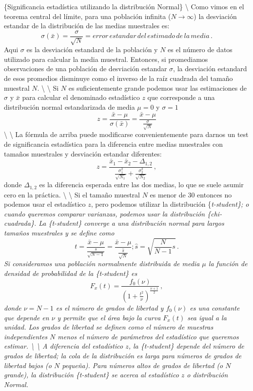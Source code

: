 \documentclass[
]{agujournal2019}
\begin{document}
\{\noindent  Significancia estadística utilizando la distribución
Normal\} \textbackslash{} Como vimos en el teorema central del límite,
para una población infinita (\(N\rightarrow\infty\)) la desviación
estandar de la distribución de las medias muestrales es:
\[\sigma(\bar{x})=\frac{\sigma}{\sqrt{N}}=error\,estandar\,del\,estimado\,de\,la\,media\,.\]
Aqui \(\sigma\) es la desviación estandard de la población y \(N\) es el
número de datos utilizado para calcular la media muestral. Entonces, si
promediamos observaciones de una población de desviación estandar
\(\sigma\), la desviación estandard de esos promedios disminuye como el
inverso de la raíz cuadrada del tamaño muestral \(N\). \textbackslash{}
\textbackslash{} Si \(N\) es suficientemente grande podemos usar las
estimaciones de \(\sigma\) y \(\bar{x}\) para calcular el denominado
estadístico \(z\) que corresponde a una distribución normal
estandarizada de media \(\mu=0\) y \(\sigma=1\)
\[z=\frac{\bar{x}-\mu}{\sigma(\bar{x})}=\frac{\bar{x}-\mu}{\frac{\sigma}{\sqrt{N}}}\]
\textbackslash{} \textbackslash{} La fórmula de arriba puede modificarse
convenientemente para darnos un test de significancia estadística para
la diferencia entre medias muestrales con tamaños muestrales y
desviación estandar diferentes:
\[z=\frac{\bar{x}_1-\bar{x}_2-\Delta_{1,2}}
  {\frac{\sigma_1^2}{\sqrt{N_1}} + \frac{\sigma_2^2}{\sqrt{N_2}}}\,,\]
donde \(\Delta_{1,2}\) es la diferencia esperada entre las dos medias,
lo que se suele asumir cero en la práctica. \textbackslash{}
\textbackslash{} Si el tamaño muestral \(N\) es menor de \(30\) entonces
no podemos usar el estadístico \(z\), pero podemos utilizar la
distribución \{\it t-student\}; o cuando queremos comparar varianzas,
podemos usar la distribución \{\it chi-cuadrada\}. La \{\it t-student\}
converge a una distribución normal para largos tamaños muestrales y se
define como
\[t=\frac{\bar{x}-\mu}{\frac{s}{\sqrt{N-1}}}=\frac{\bar{x}-\mu}{\frac{\hat{s}}{\sqrt{N}}};
\hat{s}=\sqrt{\frac{N}{N-1}s}\,.\] Si consideramos una población
normalmente distribuida de media \(\mu\) la función de densidad de
probabilidad de la \{\it t-student\} es
\[F_{x}(t)=\frac{f_0(\nu)}{\left(1+\frac{t^2}{\nu} \right)^{\frac{\nu+1}{2}}}\,,\]
donde \(\nu=N-1\) es el número de grados de libertad y \(f_0(\nu)\) es
una constante que depende en \(\nu\) y permite que el área bajo la curva
\(F_x(t)\) sea igual a la unidad. Los grados de libertad se definen como
el número de muestras independientes \(N\) menos el número de parámetros
del estadístico que queremos estimar. \textbackslash{} \textbackslash{}
A diferencia del estadístico \(z\), la \{\it t-student\} depende del
número de grados de libertad; la cola de la distribución es larga para
números de grados de libertad bajos (o \(N\) pequeña). Para números
altos de grados de libertad (o \(N\) grande), la distribución
\{\it t-student\} se acerca al estadístico \(z\) o distribución Normal.
\end{document}

